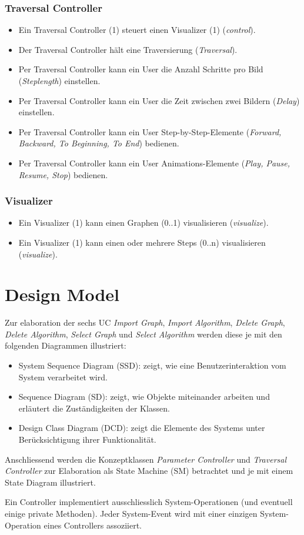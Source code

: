 \subsubsection{Traversal Controller}
\label{subsubsec:Traversal Controller}
\begin{itemize}
  \item Ein Traversal Controller (1) steuert einen Visualizer (1) (\textit{control}).
  \item Der Traversal Controller h\"alt eine Traversierung (\textit{Traversal}).
  \item Per Traversal Controller kann ein User die Anzahl Schritte pro Bild (\textit{Steplength}) einstellen.
  \item Per Traversal Controller kann ein User die Zeit zwischen zwei Bildern (\textit{Delay}) einstellen.
  \item Per Traversal Controller kann ein User Step-by-Step-Elemente (\textit{Forward, Backward, To Beginning, To End}) bedienen.
  \item Per Traversal Controller kann ein User Animations-Elemente (\textit{Play, Pause, Resume, Stop}) bedienen.
\end{itemize}

\subsubsection{Visualizer}
\label{subsubsec:Visualizer}
\begin{itemize}
  \item Ein Visualizer (1) kann einen Graphen (0..1) visualisieren (\textit{visualize}).
  \item Ein Visualizer (1) kann einen oder mehrere Steps (0..n) visualisieren (\textit{visualize}).
\end{itemize}
% 
\section{Design Model}
\label{sec:Design Model}
Zur elaboration der sechs UC \textit{Import Graph}, \textit{Import Algorithm}, \textit{Delete Graph}, \textit{Delete Algorithm}, \textit{Select Graph} und \textit{Select Algorithm} werden diese je mit den folgenden Diagrammen illustriert:
\begin{itemize}
  \item System Sequence Diagram (SSD): zeigt, wie eine Benutzerinteraktion vom System verarbeitet wird.
  \item Sequence Diagram (SD): zeigt, wie Objekte miteinander arbeiten und erl\"autert die Zust\"andigkeiten der Klassen. 
  \item Design Class Diagram (DCD): zeigt die Elemente des Systems unter Ber\"ucksichtigung ihrer Funktionalit\"at.
\end{itemize}
Anschliessend werden die Konzeptklassen \textit{Parameter Controller} und \textit{Traversal Controller} zur Elaboration als State Machine (SM) betrachtet und je mit einem State Diagram illustriert.

Ein Controller implementiert ausschliesslich System-Operationen (und eventuell einige private Methoden). Jeder System-Event wird mit einer einzigen System-Operation eines Controllers assoziiert.